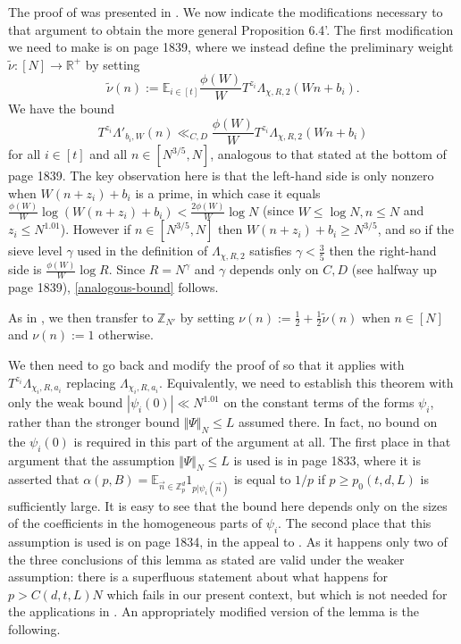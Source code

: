\documentclass[12pt]{amsart}
\numberwithin{equation}{section}  %
\theoremstyle{remark}
\theoremstyle{plain}
\numberwithin{equation}{section}
\newcommand{\Z}{\mathbb{Z}}
\newcommand{\R}{\mathbb{R}}
\newcommand{\E}{\mathbb{E}}  %
\renewcommand{\le}{\leqslant}
\renewcommand{\leq}{\leqslant}
\renewcommand{\geq}{\geqslant}
\renewcommand{\(}{\left(}
\renewcommand{\)}{\right)}
\newcommand{\vect}[1]{{\ensuremath{\vec{#1}}}}
\begin{document}
The proof of \cite[Proposition 6.4]{gt-linearprimes} was presented in \cite[Appendix D]{gt-linearprimes}. We now indicate the modifications necessary to that argument to obtain the more general Proposition 6.4'. The first modification we need to make is on page 1839, where we instead define the preliminary weight $\tilde\nu : [N] \rightarrow \R^+$ by setting
\[ \tilde\nu(n) := \E_{i \in [t]} \frac{\phi(W)}{W} T^{z_i}\Lambda_{\chi,R,2}(Wn + b_i).\] 
We have the bound
\begin{equation}\label{analogous-bound} T^{z_i}\Lambda'_{b_i,W}(n)
  \ll_{C,D} \frac{\phi(W)}{W} T^{z_i}\Lambda_{\chi, R, 2}(Wn +
  b_i)\end{equation} for all $i \in [t]$ and all $n \in [N^{3/5}, N]$,
analogous to that stated at the bottom of page 1839. The key
observation here is that the left-hand side is only nonzero when $W(n
+ z_i) + b_i$ is a prime, in which case it equals
$\frac{\phi(W)}{W}\log(W (n + z_i) + b_i) < \frac{2\phi(W)}{W} \log N$
(since $W \le \log N, n \leq N$ and $z_i \leq N^{1.01}$). However if $n \in [N^{3/5}, N]$ then $W(n + z_i) + b_i \geq N^{3/5}$, and so if the sieve level $\gamma$ used in the definition of $\Lambda_{\chi, R,2}$ satisfies $\gamma < \frac{3}{5}$ then the right-hand side is $\frac{\phi(W)}{W} \log R$. Since $R = N^{\gamma}$ and $\gamma$ depends only on $C,D$ (see halfway up page 1839), \eqref{analogous-bound} follows.


As in \cite[Appendix D]{gt-linearprimes}, we then transfer to $\Z_{N'}$ by setting $\nu(n) := \frac{1}{2} + \frac{1}{2} \tilde\nu(n)$ when $n \in [N]$ and $\nu(n) := 1$ otherwise. 

We then need to go back and modify the proof of \cite[Theorem D.3]{gt-linearprimes} so that it applies with $T^{z_i}\Lambda_{\chi_i, R, a_i}$ replacing $\Lambda_{\chi_i, R, a_i}$. Equivalently, we need to establish this theorem with only the weak bound $|\psi_i(0)| \ll N^{1.01}$ on the constant terms of the forms $\psi_i$, rather than the stronger bound $\Vert \Psi \Vert_N \leq L$ assumed there.  In fact, no bound on the $\psi_i(0)$ is required in this part of the argument at all. The first place in that argument that the assumption $\Vert \Psi \Vert_N \leq L$ is used is in page 1833, where it is asserted that $\alpha(p,B) = \E_{\vect{n} \in \Z_p^d} 1_{p | \psi_i(\vect{n})} $ is equal to $1/p$ if $p \geq p_0(t,d,L)$ is sufficiently large. It is easy to see that the bound here depends only on the sizes of the coefficients in the homogeneous parts of $\psi_i$. The second place that this assumption is used is on page 1834, in the appeal to \cite[Lemma 1.3]{gt-linearprimes}. As it happens only two of the three conclusions of this lemma as stated are valid under the weaker assumption: there is a superfluous statement about what happens for $p > C(d,t,L) N$ which fails in our present context, but which is not needed for the applications in \cite[Appendix D]{gt-linearprimes}. An appropriately modified version of the lemma is the following.
\end{document}
